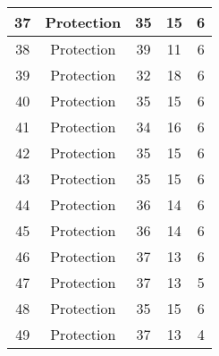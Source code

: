 \documentclass[results.tex]{subfiles}
\begin{document}
\begin{center}
\begin{tabular}{| c || c | c | c | c |}
            \hline
            37                      & Protection                   & 35                     & 15                      & 6                    \\
            \hline
            38                      & Protection                   & 39                     & 11                      & 6                    \\
            \hline
            39                      & Protection                   & 32                     & 18                      & 6                    \\
            \hline
            40                      & Protection                   & 35                     & 15                      & 6                    \\
            \hline
            41                      & Protection                   & 34                     & 16                      & 6                    \\
            \hline
            42                      & Protection                   & 35                     & 15                      & 6                    \\
            \hline
            43                      & Protection                   & 35                     & 15                      & 6                    \\
            \hline
            44                      & Protection                   & 36                     & 14                      & 6                    \\
            \hline
            45                      & Protection                   & 36                     & 14                      & 6                    \\
            \hline
            46                      & Protection                   & 37                     & 13                      & 6                    \\
            \hline
            47                      & Protection                   & 37                     & 13                      & 5                    \\
            \hline
            48                      & Protection                   & 35                     & 15                      & 6                    \\
            \hline
            49                      & Protection                   & 37                     & 13                      & 4                    \\
            \hline
        \end{tabular}
    \end{center}
\end{document}

